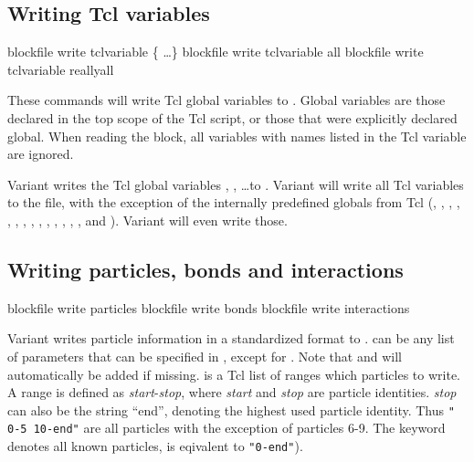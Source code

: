 \subsection{Writing Tcl variables}

\begin{essyntax}
   blockfile  write tclvariable \{
    \dots \}
   blockfile  write tclvariable all
   blockfile  write tclvariable reallyall
\end{essyntax}

These commands will write Tcl global variables to .
Global variables are those declared in the top scope of the Tcl
script, or those that were explicitly declared global.  When reading
the block, all variables with names listed in the Tcl variable
 are ignored.

Variant  writes the Tcl global variables ,
, \dots to . Variant  will write
all Tcl variables to the file, with the exception of the internally
predefined globals from Tcl (, ,
, , , ,
, , , ,
, , , ,
 and ). Variant  will
even write those.

\subsection{Writing particles, bonds and interactions}
\begin{essyntax}
   blockfile  write particles 
   
   blockfile  write bonds 
   blockfile  write interactions
\end{essyntax}

Variant  writes
particle information in a standardized format to .
 can be any list of parameters that can be specified in
, except for .  Note that
 and  will automatically be added if missing.
 is a Tcl list of ranges which particles to write. A range
is defined as \textit{start}-\textit{stop}, where \textit{start} and
\textit{stop} are particle identities. \textit{stop} can also be the
string ``end'', denoting the highest used particle identity. Thus
\texttt{"{} 0-5 10-end"{}} are all particles with the exception of
particles 6-9.  The keyword  denotes all known particles,
\ie{} is eqivalent to \texttt{"0-end"{}}).

